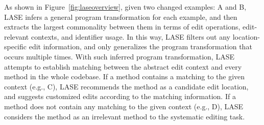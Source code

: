 As shown in Figure~\ref{fig:laseoverview}, given two changed examples: A and B, LASE infers a general program transformation for each example, and then extracts the largest commonality between them in terms of edit operations, edit-relevant contexts, and identifier usage. In this way, LASE filters out any location-specific edit information, and only generalizes the program transformation that occurs multiple times. With such inferred program transformation, LASE attempts to establish matching between the abstract edit context and every method in the whole codebase. If a method contains a matching to the given context (e.g., C), LASE recommends the method as a candidate edit location, and suggests customized edits according to the matching information. If a method does not contain any matching to the given context (e.g., D), LASE considers the method as an irrelevant method to the systematic editing task.